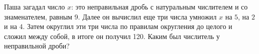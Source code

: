 
Паша загадал число $x$: это неправильная дробь с натуральным числителем и со знаменателем, равным 9. 
Далее он вычислил еще три числа умножил $x$ на $5$, на $2$ и на $4$. 
Затем округлил эти три числа по правилам округления до целого и сложил между собой, в итоге 
он получил 120. Каким был числитель у неправильной дроби?

\soultionSection

